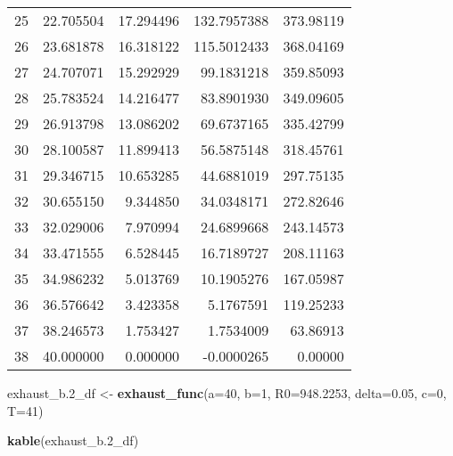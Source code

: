 \documentclass[
]{article}
\newenvironment{Shaded}{\begin{snugshade}}{\end{snugshade}}
\newcommand{\AttributeTok}[1]{\textcolor[rgb]{0.13,0.29,0.53}{#1}}
\newcommand{\DecValTok}[1]{\textcolor[rgb]{0.00,0.00,0.81}{#1}}
\newcommand{\FloatTok}[1]{\textcolor[rgb]{0.00,0.00,0.81}{#1}}
\newcommand{\FunctionTok}[1]{\textcolor[rgb]{0.13,0.29,0.53}{\textbf{#1}}}
\newcommand{\NormalTok}[1]{#1}
\newcommand{\OtherTok}[1]{\textcolor[rgb]{0.56,0.35,0.01}{#1}}
\begin{document}
\begin{longtable}[]{@{}rrrrr@{}}
25 & 22.705504 & 17.294496 & 132.7957388 & 373.98119 \\
26 & 23.681878 & 16.318122 & 115.5012433 & 368.04169 \\
27 & 24.707071 & 15.292929 & 99.1831218 & 359.85093 \\
28 & 25.783524 & 14.216477 & 83.8901930 & 349.09605 \\
29 & 26.913798 & 13.086202 & 69.6737165 & 335.42799 \\
30 & 28.100587 & 11.899413 & 56.5875148 & 318.45761 \\
31 & 29.346715 & 10.653285 & 44.6881019 & 297.75135 \\
32 & 30.655150 & 9.344850 & 34.0348171 & 272.82646 \\
33 & 32.029006 & 7.970994 & 24.6899668 & 243.14573 \\
34 & 33.471555 & 6.528445 & 16.7189727 & 208.11163 \\
35 & 34.986232 & 5.013769 & 10.1905276 & 167.05987 \\
36 & 36.576642 & 3.423358 & 5.1767591 & 119.25233 \\
37 & 38.246573 & 1.753427 & 1.7534009 & 63.86913 \\
38 & 40.000000 & 0.000000 & -0.0000265 & 0.00000 \\
\end{longtable}

\begin{Shaded}
\begin{Highlighting}[]
\NormalTok{exhaust\_b}\FloatTok{.2}\NormalTok{\_df }\OtherTok{\textless{}{-}} \FunctionTok{exhaust\_func}\NormalTok{(}\AttributeTok{a=}\DecValTok{40}\NormalTok{, }\AttributeTok{b=}\DecValTok{1}\NormalTok{, }\AttributeTok{R0=}\FloatTok{948.2253}\NormalTok{, }\AttributeTok{delta=}\FloatTok{0.05}\NormalTok{, }\AttributeTok{c=}\DecValTok{0}\NormalTok{, }\AttributeTok{T=}\DecValTok{41}\NormalTok{)}

\FunctionTok{kable}\NormalTok{(exhaust\_b}\FloatTok{.2}\NormalTok{\_df)}
\end{Highlighting}
\end{Shaded}
\end{document}
